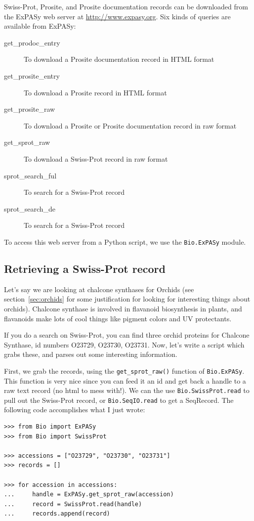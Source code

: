 \documentclass{report}
\begin{document}
Swiss-Prot, Prosite, and Prosite documentation records can be downloaded from the ExPASy web server at \url{http://www.expasy.org}. Six kinds of queries are available from ExPASy:
\begin{description}
\item[get\_prodoc\_entry]To download a Prosite documentation record in HTML format
\item[get\_prosite\_entry]To download a Prosite record in HTML format
\item[get\_prosite\_raw]To download a Prosite or Prosite documentation record in raw format
\item[get\_sprot\_raw]To download a Swiss-Prot record in raw format
\item[sprot\_search\_ful]To search for a Swiss-Prot record
\item[sprot\_search\_de]To search for a Swiss-Prot record
\end{description}
To access this web server from a Python script, we use the \verb|Bio.ExPASy| module.

\subsection{Retrieving a Swiss-Prot record}
\label{subsec:expasy_swissprot}

Let's say we are looking at chalcone synthases for Orchids (see section~\ref{sec:orchids} for some justification for looking for interesting things about orchids). Chalcone synthase is involved in flavanoid biosynthesis in plants, and flavanoids make lots of cool things like pigment colors and UV protectants. 

If you do a search on Swiss-Prot, you can find three orchid proteins for Chalcone Synthase, id numbers O23729, O23730, O23731. Now, let's write a script which grabs these, and parses out some interesting information.

First, we grab the records, using the \verb|get_sprot_raw()| function of \verb|Bio.ExPASy|. This function is very nice since you can feed it an id and get back a handle to a raw text record (no html to mess with!). We can the use \verb|Bio.SwissProt.read| to pull out the Swiss-Prot record, or \verb|Bio.SeqIO.read| to get a SeqRecord. The following code accomplishes what I just wrote:

\begin{verbatim}
>>> from Bio import ExPASy
>>> from Bio import SwissProt

>>> accessions = ["O23729", "O23730", "O23731"]
>>> records = []

>>> for accession in accessions:
...     handle = ExPASy.get_sprot_raw(accession)
...     record = SwissProt.read(handle)
...     records.append(record)
\end{verbatim}
\end{document}
